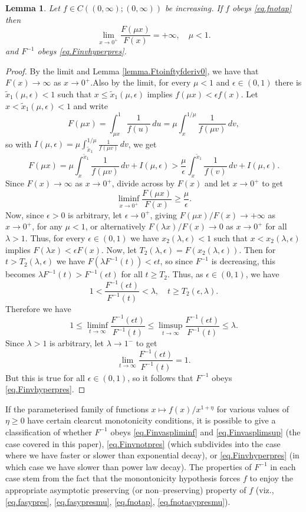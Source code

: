 \documentclass[a4paper,10pt,reqno]{amsart}
\numberwithin{equation}{section}
\newtheorem{lemma}{Lemma}
\theoremstyle{definition}
\theoremstyle{remark}
\DeclareMathOperator{\1}{\mathbbm 1}
\begin{document}
	\begin{lemma} \label{lem.fnotapFinvhyper}
		Let $f\in C((0,\infty);(0,\infty))$ be increasing. If $f$ obeys \eqref{eq.fnotap} 	then 
		\[
		\lim_{x\to 0^+} \frac{F(\mu x)}{F(x)}=+\infty, \quad \mu<1.
		\]
		and $F^{-1}$ obeys \eqref{eq.Finvhyperpres}.
	\end{lemma}
	\begin{proof}
		By the limit and Lemma \ref{lemma.Ftoinftyfderiv0}, we have that $F(x)\to \infty$ as $x\to 0^+$.Also by the limit, for every $\mu<1$ and $\epsilon\in (0,1)$ there is $\tilde{x}_1(\mu,\epsilon)<1$ such that $x\leq \tilde{x}_1(\mu,\epsilon)$ implies $f(\mu x)<\epsilon f(x)$. Let $x<\tilde{x}_1(\mu,\epsilon)<1$ and write 
		\[
		F(\mu x) = \int_{\mu x}^1 \frac{1}{f(u)}\,du = \mu \int_{x}^{1/\mu} \frac{1}{f(\mu v)}\,dv,
		\]
		so with $I(\mu,\epsilon)= \mu \int_{\tilde{x}_1}^{1/\mu} \frac{1}{f(\mu v)}\,dv$, we get  
		\[
		F(\mu x) = \mu \int_{x}^{\tilde{x}_1} \frac{1}{f(\mu v)}\,dv + I(\mu,\epsilon) 
		> \frac{\mu}{\epsilon} \int_{x}^{\tilde{x}_1} \frac{1}{f(v)}\,dv +I(\mu,\epsilon). 
		\]
		Since $F(x)\to\infty$ as $x\to 0^+$, divide across by $F(x)$ and let $x\to 0^+$ to get 
		\[
		\liminf_{x\to 0^+} \frac{F(\mu x)}{F(x)}\geq \frac{\mu}{\epsilon}.
		\]
		Now, since $\epsilon>0$ is arbitrary, let $\epsilon\to 0^+$, giving 
		$F(\mu x)/F(x)\to +\infty$ as $x\to 0^+$, for any $\mu<1$, or alternatively $F(\lambda x)/F(x)\to 0$ as $x\to 0^+$ for all $\lambda>1$. Thus, for every $\epsilon\in (0,1)$ we have $x_2(\lambda,\epsilon)<1$ such that $x<x_2(\lambda,\epsilon)$ implies $F(\lambda x)<\epsilon F(x)$. Now, let 
		$T_2(\lambda,\epsilon)=F(x_2(\lambda,\epsilon))$. Then for $t>T_2(\lambda,\epsilon)$ we have $F(\lambda F^{-1}(t))<\epsilon t$, so since $F^{-1}$ is decreasing, this becomes $\lambda F^{-1}(t)>F^{-1}(\epsilon t)$ for all $t\geq T_2$. Thus, as $\epsilon\in (0,1)$, we have  
		\[
		1<\frac{F^{-1}(\epsilon t)}{F^{-1}(t)}<\lambda, \quad t\geq T_2(\epsilon,\lambda).
		\]  
		Therefore we have 
		\[
		1\leq \liminf_{t\to\infty} \frac{F^{-1}(\epsilon t)}{F^{-1}(t)}\leq 
		\limsup_{t\to\infty} \frac{F^{-1}(\epsilon t)}{F^{-1}(t)}\leq\lambda.
		\]
		Since $\lambda>1$ is arbitrary, let $\lambda\to 1^-$ to get 
		\[
		\lim_{t\to\infty} \frac{F^{-1}(\epsilon t)}{F^{-1}(t)}=1.
		\]
		But this is true for all $\epsilon\in (0,1)$, so it follows that $F^{-1}$ obeys \eqref{eq.Finvhyperpres}.
	\end{proof}
	
	If the parameterised family of functions $x\mapsto f(x)/x^{1+\eta}$ for various values of $\eta\geq 0$ have certain clearcut monotonicity conditions, it is possible to give a classification of whether $F^{-1}$ obeys \eqref{eq.Finvaspliminf} and \eqref{eq.Finvasplimsup} (the case covered in this paper), \eqref{eq.Finvnotpres} (which subdivides into the case where we have faster or slower than exponential decay), or \eqref{eq.Finvhyperpres} (in which case we have slower than power law decay). The properties of $F^{-1}$ in each case stem from the fact that the monontonicity hypothesis forces $f$ to enjoy the appropriate asymptotic preserving (or non--preserving) property of $f$ (viz., \eqref{eq.fasypres}, \eqref{eq.fasypresmu}, \eqref{eq.fnotap}, \eqref{eq.fnotasypresmu}).  
	
\end{document}
